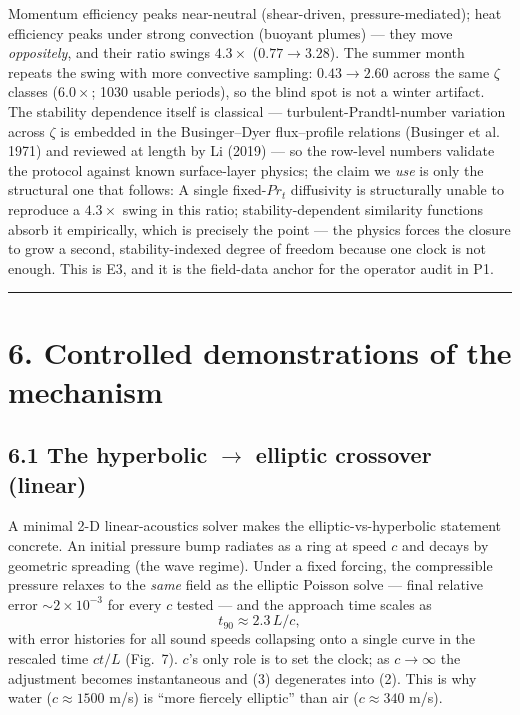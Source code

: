 \documentclass[aps,prfluids,preprint,superscriptaddress,nofootinbib]{revtex4-2}
\begin{document}
Momentum efficiency peaks near-neutral (shear-driven, pressure-mediated); heat efficiency peaks under strong convection (buoyant plumes) --- they move \emph{oppositely}, and their ratio swings $\mathbf{4.3\times}$ ($0.77\to 3.28$). The summer month repeats the swing with more convective sampling: $0.43\to 2.60$ across the same $\zeta$ classes ($6.0\times$; 1030 usable periods), so the blind spot is not a winter artifact. The stability dependence itself is classical --- turbulent-Prandtl-number variation across $\zeta$ is embedded in the Businger--Dyer flux--profile relations (Businger et al. 1971) and reviewed at length by Li (2019) --- so the row-level numbers validate the protocol against known surface-layer physics; the claim we \emph{use} is only the structural one that follows: A single fixed-$Pr_{t}$ diffusivity is structurally unable to reproduce a $4.3\times$ swing in this ratio; stability-dependent similarity functions absorb it empirically, which is precisely the point --- the physics forces the closure to grow a second, stability-indexed degree of freedom because one clock is not enough. This is E3, and it is the field-data anchor for the operator audit in P1.

\medskip\hrule\medskip

\section*{6. Controlled demonstrations of the mechanism}

\subsection*{6.1 The hyperbolic $\to$ elliptic crossover (linear)}

A minimal 2-D linear-acoustics solver makes the elliptic-vs-hyperbolic statement concrete. An initial pressure bump radiates as a ring at speed $c$ and decays by geometric spreading (the wave regime). Under a fixed forcing, the compressible pressure relaxes to the \emph{same} field as the elliptic Poisson solve --- final relative error $\sim 2\times 10^{-3}$ for every $c$ tested --- and the approach time scales as
\[
t_{90}\approx 2.3\,L/c ,
\tag{5}
\]
with error histories for all sound speeds collapsing onto a single curve in the rescaled time $ct/L$ (Fig.~7). $c$'s only role is to set the clock; as $c\to\infty$ the adjustment becomes instantaneous and (3) degenerates into (2). This is why water ($c\approx 1500$ m/s) is ``more fiercely elliptic'' than air ($c\approx 340$ m/s).
\end{document}
